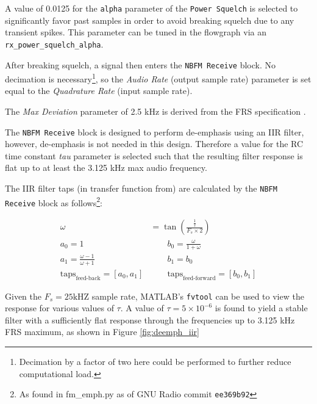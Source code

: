 A value of 0.0125 for the \texttt{alpha} parameter of the \texttt{Power Squelch} is
selected to significantly favor past samples in order to avoid breaking squelch
due to any transient spikes. This parameter can be tuned in the flowgraph via
an \texttt{rx\_power\_squelch\_alpha}.

After breaking squelch, a signal then enters the \texttt{NBFM Receive} block.
No decimation is necessary\footnote{Decimation by a factor of two here
could be performed to further reduce computational load.}, so the \textit{Audio
Rate} (output sample rate) parameter is set equal to the \textit{Quadrature
Rate} (input sample rate).

The \textit{Max Deviation} parameter of 2.5 kHz is derived from the \ac{FRS}
specification \cite{FCC_PART_95B}.

The \texttt{NBFM Receive} block is designed to perform de-emphasis using an
\ac{IIR} filter, however, de-emphasis is not needed in this design. Therefore
a value for the RC time constant \textit{tau} parameter is selected such that
the resulting filter response is flat up to at least the 3.125 kHz max audio
frequency.

The IIR filter taps (in transfer function from) are calculated by the
\texttt{NBFM Receive} block as follows\footnote{As found in fm\_emph.py as of
GNU Radio commit \texttt{ee369b92}}:

\begin{align*}
  \omega &= \tan\left(\frac{\frac{1}{\tau}}{F_s \times 2}\right) \\
  a_0 = 1                             & \qquad  b_0 = \frac{\omega}{1 + \omega}   \\
  a_1 = \frac{\omega - 1}{\omega + 1} & \qquad b_1 = b_0 \\
  \text{taps}_{\text{feed-back}}    = [a_0, a_1] & \qquad
  \text{taps}_{\text{feed-forward}} = [b_0, b_1]
\end{align*}

Given the $F_s = 25 \text{kHZ}$ sample rate, MATLAB's \texttt{fvtool} can be
used to view the response for various values of $\tau$. A value of $\tau
= 5 \times 10^{-6}$ is found to yield a stable filter with a sufficiently flat
response through the frequencies up to 3.125 kHz \ac{FRS} maximum, as shown in
Figure \ref{fig:deemph_iir}

